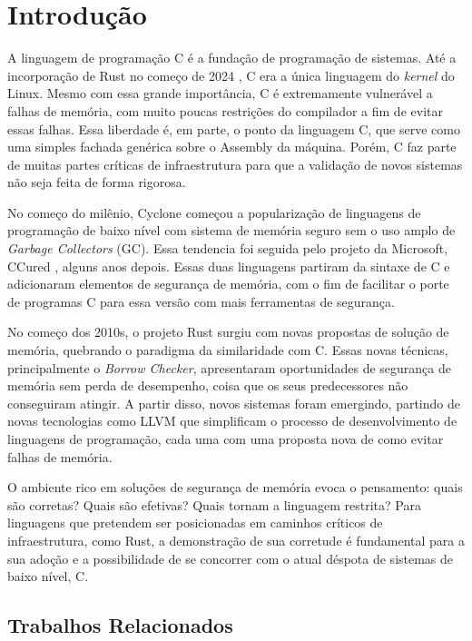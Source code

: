 \chapter{Introdução}

A linguagem de programação C \cite{CLANG} é a fundação de programação de sistemas. Até a incorporação de Rust no começo de 2024 \cite{RUSTFORLINUX}, C era a única linguagem do \emph{kernel} do Linux. Mesmo com essa grande importância, C é extremamente vulnerável a falhas de memória, com muito poucas restrições do compilador a fim de evitar essas falhas. Essa liberdade é, em parte, o ponto da linguagem C, que serve como uma simples fachada genérica sobre o Assembly da máquina. Porém, C faz parte de muitas partes críticas de infraestrutura para que a validação de novos sistemas não seja feita de forma rigorosa. 

No começo do milênio, Cyclone \cite{CYCLONE1} começou a popularização de linguagens de programação de baixo nível com sistema de memória seguro sem o uso amplo de \emph{Garbage Collectors} (GC). Essa tendencia foi seguida pelo projeto da Microsoft, CCured \cite{CCURED}, alguns anos depois. Essas duas linguagens partiram da sintaxe de C e adicionaram elementos de segurança de memória, com o fim de facilitar o porte de programas C para essa versão com mais ferramentas de segurança.

No começo dos 2010s, o projeto Rust \cite{RUSTBOOK} surgiu com novas propostas de solução de memória, quebrando o paradigma da similaridade com C. Essas novas técnicas, principalmente o \emph{Borrow Checker}, apresentaram oportunidades de segurança de memória sem perda de desempenho, coisa que os seus predecessores não conseguiram atingir. A partir disso, novos sistemas foram emergindo, partindo de novas tecnologias como LLVM  que simplificam o processo de desenvolvimento de linguagens de programação, cada uma com uma proposta nova de como evitar falhas de memória.

O ambiente rico em soluções de segurança de memória evoca o pensamento: quais são corretas? Quais são efetivas? Quais tornam a linguagem restrita? Para linguagens que pretendem ser posicionadas em caminhos críticos de infraestrutura, como Rust, a demonstração de sua corretude é fundamental para a sua adoção e a possibilidade de se concorrer com o atual déspota de sistemas de baixo nível, C.

\section{Trabalhos Relacionados}


